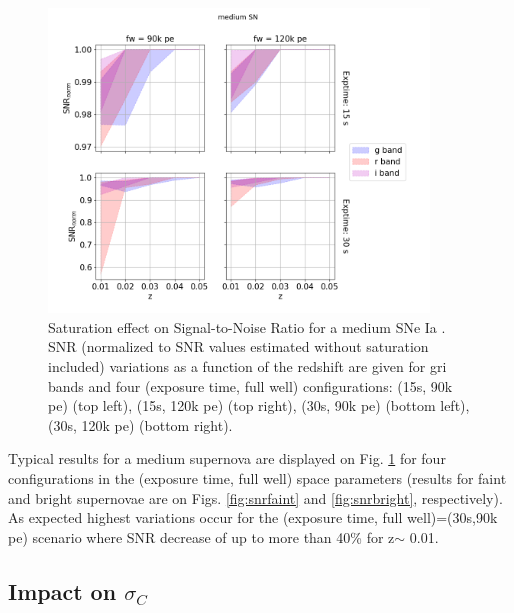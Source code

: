 \documentclass[\docopts]{\docclass}
\newcommand{\sne}{{SNe Ia }}
\newcommand{\pe}{{pe}}
\newcommand{\colorerr}{{$\sigma_C$}}
\begin{document}
\begin{figure}[htbp]
\begin{center}
  \includegraphics[width=0.9\textwidth]{SNR_medium.png}
 \caption{Saturation effect on Signal-to-Noise Ratio for a medium \sne. SNR (normalized to SNR values estimated without saturation included) variations as a function of the redshift are given for gri bands and four (exposure time, full well) configurations: (15s, 90k \pe) (top left),  (15s, 120k \pe) (top right), (30s, 90k \pe) (bottom left),  (30s, 120k \pe) (bottom right).}\label{fig:snrmedium}
\end{center}
\end{figure}

Typical results for a medium supernova are displayed on Fig. \ref{fig:snrmedium} for four configurations in the (exposure time, full well) space parameters (results for faint and bright supernovae are on Figs. \ref{fig:snrfaint} and  \ref{fig:snrbright}, respectively). As expected highest variations occur for the (exposure time, full well)=(30s,90k \pe) scenario where SNR decrease of up to more than 40\% for z$\sim$ 0.01. 

\subsection{Impact on \colorerr}
\end{document}
